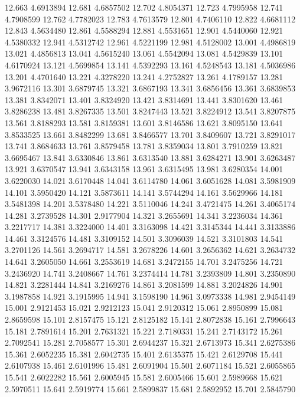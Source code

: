 12.663 4.6913894
12.681 4.6857502
12.702 4.8054371
12.723 4.7995958
12.741 4.7908599
12.762 4.7782023
12.783 4.7613579
12.801 4.7406110
12.822 4.6681112
12.843 4.5634480
12.861 4.5588294
12.881 4.5531651
12.901 4.5440060
12.921 4.5380332
12.941 4.5312742
12.961 4.5221199
12.981 4.5128002
13.001 4.4986819
13.021 4.4856813
13.041 4.5615240
13.061 4.5542094
13.081 4.5429839
13.101 4.6170924
13.121 4.5699854
13.141 4.5392293
13.161 4.5248543
13.181 4.5036986
13.201 4.4701640
13.221 4.3278220
13.241 4.2752827
13.261 4.1789157
13.281 3.9672116
13.301 3.6879745
13.321 3.6867193
13.341 3.6856456
13.361 3.6839853
13.381 3.8342071
13.401 3.8324920
13.421 3.8314691
13.441 3.8301620
13.461 3.8286238
13.481 3.8267335
13.501 3.8247443
13.521 3.8224912
13.541 3.8207875
13.561 3.8188293
13.581 3.8159381
13.601 3.8146586
13.621 3.8095150
13.641 3.8533525
13.661 3.8482299
13.681 3.8466577
13.701 3.8409607
13.721 3.8291017
13.741 3.8684633
13.761 3.8579458
13.781 3.8359034
13.801 3.7910259
13.821 3.6695467
13.841 3.6330846
13.861 3.6313540
13.881 3.6284271
13.901 3.6263487
13.921 3.6370547
13.941 3.6343158
13.961 3.6315495
13.981 3.6280354
14.001 3.6220030
14.021 3.6170448
14.041 3.6114780
14.061 3.6051628
14.081 3.5981909
14.101 3.5950420
14.121 3.5873611
14.141 3.5744294
14.161 3.5629966
14.181 3.5481398
14.201 3.5378480
14.221 3.5110046
14.241 3.4721475
14.261 3.4065174
14.281 3.2739528
14.301 2.9177904
14.321 3.2655691
14.341 3.2236034
14.361 3.2217717
14.381 3.3224000
14.401 3.3163098
14.421 3.3145344
14.441 3.3133886
14.461 3.3124576
14.481 3.3109152
14.501 3.3096039
14.521 3.3101803
14.541 3.2701126
14.561 3.2694717
14.581 3.2678226
14.601 3.2656362
14.621 3.2634732
14.641 3.2605050
14.661 3.2553619
14.681 3.2472155
14.701 3.2475256
14.721 3.2436920
14.741 3.2408667
14.761 3.2374414
14.781 3.2393809
14.801 3.2350890
14.821 3.2281444
14.841 3.2169276
14.861 3.2081599
14.881 3.2024826
14.901 3.1987858
14.921 3.1915995
14.941 3.1598190
14.961 3.0973338
14.981 2.9454149
15.001 2.9121453
15.021 2.9212123
15.041 2.9120312
15.061 2.8950899
15.081 2.8659598
15.101 2.8157475
15.121 2.8125182
15.141 2.8072838
15.161 2.7996643
15.181 2.7891614
15.201 2.7631321
15.221 2.7180331
15.241 2.7143172
15.261 2.7092541
15.281 2.7058577
15.301 2.6944237
15.321 2.6713973
15.341 2.6275386
15.361 2.6052235
15.381 2.6042735
15.401 2.6135375
15.421 2.6129708
15.441 2.6107938
15.461 2.6101996
15.481 2.6091904
15.501 2.6071184
15.521 2.6055865
15.541 2.6022282
15.561 2.6005945
15.581 2.6005466
15.601 2.5989668
15.621 2.5970511
15.641 2.5919774
15.661 2.5899837
15.681 2.5892952
15.701 2.5845790
